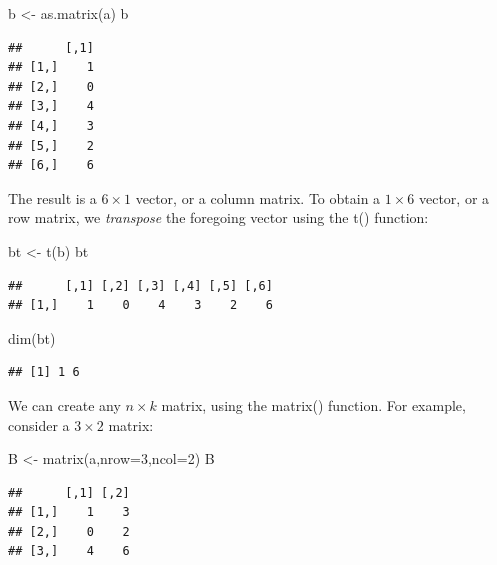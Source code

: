 \documentclass[
  12pt,
  oneside]{book}
\newenvironment{Shaded}{\begin{snugshade}}{\end{snugshade}}
\newcommand{\AttributeTok}[1]{\textcolor[rgb]{0.77,0.63,0.00}{#1}}
\newcommand{\DecValTok}[1]{\textcolor[rgb]{0.00,0.00,0.81}{#1}}
\newcommand{\FunctionTok}[1]{\textcolor[rgb]{0.00,0.00,0.00}{#1}}
\newcommand{\NormalTok}[1]{#1}
\newcommand{\OtherTok}[1]{\textcolor[rgb]{0.56,0.35,0.01}{#1}}
\begin{document}
\begin{Shaded}
\begin{Highlighting}[]
\NormalTok{b }\OtherTok{\textless{}{-}} \FunctionTok{as.matrix}\NormalTok{(a)}
\NormalTok{b}
\end{Highlighting}
\end{Shaded}

\begin{verbatim}
##      [,1]
## [1,]    1
## [2,]    0
## [3,]    4
## [4,]    3
## [5,]    2
## [6,]    6
\end{verbatim}

The result is a \(6 \times 1\) vector, or a column matrix. To obtain a \(1 \times 6\) vector, or a row matrix, we \emph{transpose} the foregoing vector using the t() function:

\begin{Shaded}
\begin{Highlighting}[]
\NormalTok{bt }\OtherTok{\textless{}{-}} \FunctionTok{t}\NormalTok{(b)}
\NormalTok{bt}
\end{Highlighting}
\end{Shaded}

\begin{verbatim}
##      [,1] [,2] [,3] [,4] [,5] [,6]
## [1,]    1    0    4    3    2    6
\end{verbatim}

\begin{Shaded}
\begin{Highlighting}[]
\FunctionTok{dim}\NormalTok{(bt)}
\end{Highlighting}
\end{Shaded}

\begin{verbatim}
## [1] 1 6
\end{verbatim}

We can create any \(n \times k\) matrix, using the matrix() function. For example, consider a \(3 \times 2\) matrix:

\begin{Shaded}
\begin{Highlighting}[]
\NormalTok{B }\OtherTok{\textless{}{-}} \FunctionTok{matrix}\NormalTok{(a,}\AttributeTok{nrow=}\DecValTok{3}\NormalTok{,}\AttributeTok{ncol=}\DecValTok{2}\NormalTok{)}
\NormalTok{B}
\end{Highlighting}
\end{Shaded}

\begin{verbatim}
##      [,1] [,2]
## [1,]    1    3
## [2,]    0    2
## [3,]    4    6
\end{verbatim}
\end{document}
